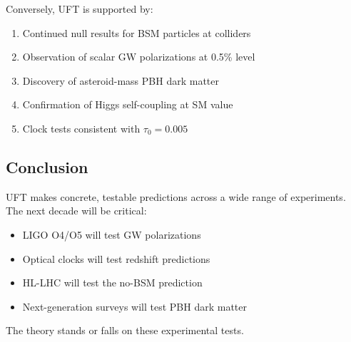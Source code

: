 Conversely, UFT is supported by:
\begin{enumerate}
    \item Continued null results for BSM particles at colliders
    \item Observation of scalar GW polarizations at 0.5\% level
    \item Discovery of asteroid-mass PBH dark matter
    \item Confirmation of Higgs self-coupling at SM value
    \item Clock tests consistent with $\tau_0 = 0.005$
\end{enumerate}

\subsection{Conclusion}

UFT makes concrete, testable predictions across a wide range of experiments. The next decade will be critical:
\begin{itemize}
    \item LIGO O4/O5 will test GW polarizations
    \item Optical clocks will test redshift predictions
    \item HL-LHC will test the no-BSM prediction
    \item Next-generation surveys will test PBH dark matter
\end{itemize}

The theory stands or falls on these experimental tests.

